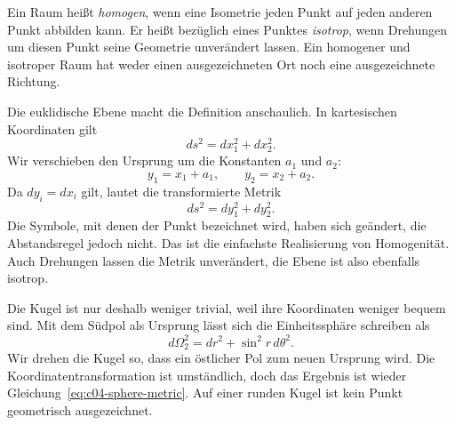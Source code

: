 \begin{definition}
Ein Raum heißt \emph{homogen}, wenn eine Isometrie jeden Punkt auf jeden anderen Punkt abbilden kann. Er heißt bezüglich eines Punktes \emph{isotrop}, wenn Drehungen um diesen Punkt seine Geometrie unverändert lassen. Ein homogener und isotroper Raum hat weder einen ausgezeichneten Ort noch eine ausgezeichnete Richtung.
\end{definition}

Die euklidische Ebene macht die Definition anschaulich. In kartesischen Koordinaten gilt
\begin{equation}
ds^2=dx_1^2+dx_2^2.
\label{eq:c04-flat-metric}
\end{equation}
Wir verschieben den Ursprung um die Konstanten \(a_1\) und \(a_2\):
\begin{equation}
y_1=x_1+a_1,
\qquad
y_2=x_2+a_2.
\label{eq:c04-flat-translation}
\end{equation}
Da \(dy_i=dx_i\) gilt, lautet die transformierte Metrik
\begin{equation}
ds^2=dy_1^2+dy_2^2.
\end{equation}
Die Symbole, mit denen der Punkt bezeichnet wird, haben sich geändert, die Abstandsregel jedoch nicht. Das ist die einfachste Realisierung von Homogenität. Auch Drehungen lassen die Metrik unverändert, die Ebene ist also ebenfalls isotrop.

Die Kugel ist nur deshalb weniger trivial, weil ihre Koordinaten weniger bequem sind. Mit dem Südpol als Ursprung lässt sich die Einheitssphäre schreiben als
\begin{equation}
d\Omega_2^2=dr^2+\sin^2 r\,d\theta^2.
\label{eq:c04-sphere-metric}
\end{equation}
Wir drehen die Kugel so, dass ein östlicher Pol zum neuen Ursprung wird. Die Koordinatentransformation ist umständlich, doch das Ergebnis ist wieder Gleichung~\eqref{eq:c04-sphere-metric}. Auf einer runden Kugel ist kein Punkt geometrisch ausgezeichnet.

\begin{classroomqa}
\end{classroomqa}

